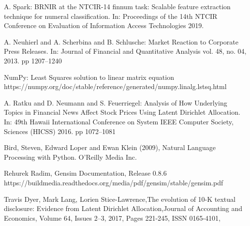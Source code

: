 \documentclass[12pt,journal,letterpaper,oneside,onecolumn]{IEEEtran}
\begin{document}
\begin{thebibliography}{1}
    A. Spark: BRNIR at the NTCIR-14 finnum task: Scalable feature extraction technique for numeral classification. In: Proceedings of the 14th NTCIR Conference on Evaluation of Information Access Technologies 2019.
    
    A. Neuhierl and A. Scherbina and B. Schlusche: Market Reaction to Corporate Press Releases. In: Journal of Financial and Quantitative Analysis vol. 48, no. 04, 2013. pp 1207–1240
    
    NumPy: Least Squares solution to linear matrix equation https://numpy.org/doc/stable/reference/generated/numpy.linalg.lstsq.html
    
    A. Ratku and D. Neumann and S. Feuerriegel: Analysis of How Underlying Topics in Financial News Affect Stock Prices Using Latent Dirichlet Allocation. In: 49th Hawaii International Conference on System IEEE Computer Society, Sciences (HICSS) 2016. pp 1072–1081
    
    Bird, Steven, Edward Loper and Ewan Klein (2009), Natural Language Processing with Python. O’Reilly Media Inc.
    
    Rehurek Radim, Gensim Documentation, Release 0.8.6 https://buildmedia.readthedocs.org/media/pdf/gensim/stable/gensim.pdf

    Travis Dyer, Mark Lang, Lorien Stice-Lawrence,The evolution of 10-K textual disclosure: Evidence from Latent Dirichlet Allocation,Journal of Accounting and Economics, Volume 64, Issues 2–3, 2017, Pages 221-245, ISSN 0165-4101,
\end{thebibliography}

%
\end{document}
